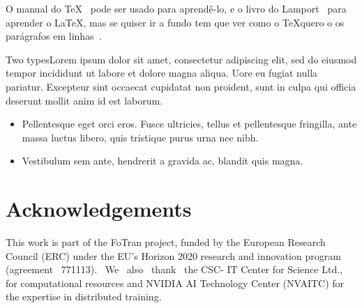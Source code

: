 \documentclass{article}
\begin{document}
O manual do \TeX~\cite{knuth1986} pode ser usado para aprendê-lo, e o livro do
Lamport~\cite{lamport1994} para aprender o \LaTeX, mas se quiser ir a fundo tem
que ver como o \TeX quero o os parágrafos em linhas~\cite{knuth1981}.

Two typesLorem ipsum dolor sit amet, consectetur adipiscing elit, sed
do eiusmod tempor incididunt ut labore et dolore magna aliqua. Uore eu
fugiat nulla pariatur. Excepteur sint occaecat cupidatat non proident,
sunt in culpa qui officia deserunt mollit anim id est laborum.



\begin{itemize}
\item Pellentesque eget orci eros. Fusce ultricies, tellus et
  pellentesque fringilla, ante massa luctus libero, quis tristique
  purus urna nec nibh. 
\item Vestibulum sem ante, hendrerit a gravida ac, blandit quis magna.
\end{itemize}


\section*{Acknowledgements}
\small \textnormal{This work is part of the FoTran project, funded by the European Research Council (ERC) under the EU's Horizon 2020 research and innovation program (agreement \textnumero{}~771113). ~We ~also ~thank ~the CSC- IT Center for Science Ltd., for computational resources and NVIDIA AI Technology Center (NVAITC) for the expertise in distributed training.}
\end{document}
